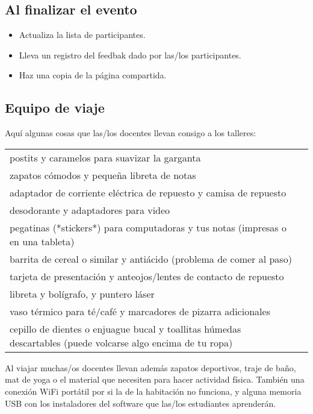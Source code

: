 \subsection*{Al finalizar el evento}

\begin{itemize}

\item
  Actualiza la lista de participantes.

\item
  Lleva un registro del feedbak dado por las/los participantes.

\item
  Haz una copia de la página compartida.

\end{itemize}

\subsection*{Equipo de viaje}

Aquí algunas cosas que las/los docentes llevan consigo a los talleres:

\begin{longtable}{p{}p{}}

postits y caramelos para suavizar la garganta \\
zapatos cómodos y pequeña libreta de notas \\
adaptador de corriente eléctrica de repuesto y camisa de repuesto \\
desodorante y adaptadores para video \\
pegatinas (*stickers*) para computadoras y tus notas (impresas o en una tableta) \\
barrita de cereal o similar y antiácido (problema de comer al paso) \\
tarjeta de presentación y anteojos/lentes de contacto de repuesto \\
libreta y bolígrafo, y puntero láser \\
vaso térmico para té/café y marcadores de pizarra adicionales \\
cepillo de dientes o enjuague bucal y toallitas húmedas descartables (puede volcarse algo encima de tu ropa) \\

\end{longtable}

Al viajar
muchas/os docentes llevan además zapatos deportivos, traje de baño, mat de yoga
o el material que necesiten para hacer actividad física.
También una conexión WiFi portátil por si la de la habitación no funciona,
y alguna memoria USB con los instaladores del software que las/los estudiantes aprenderán.

